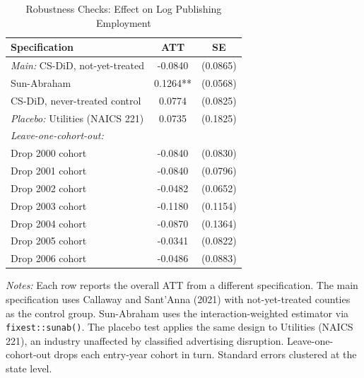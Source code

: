 \begin{table}[htbp]
\centering
\caption{Robustness Checks: Effect on Log Publishing Employment}
\label{tab:robust}
\begin{threeparttable}
\begin{tabular}{lcc}
\toprule
Specification & ATT & SE \\
\midrule
\textit{Main:} CS-DiD, not-yet-treated & -0.0840 & (0.0865) \\
Sun-Abraham & 0.1264** & (0.0568) \\
CS-DiD, never-treated control & 0.0774 & (0.0825) \\
\textit{Placebo:} Utilities (NAICS 221) & 0.0735 & (0.1825) \\
\midrule
\multicolumn{3}{l}{\textit{Leave-one-cohort-out:}} \\
\quad Drop 2000 cohort & -0.0840 & (0.0830) \\
\quad Drop 2001 cohort & -0.0840 & (0.0796) \\
\quad Drop 2002 cohort & -0.0482 & (0.0652) \\
\quad Drop 2003 cohort & -0.1180 & (0.1154) \\
\quad Drop 2004 cohort & -0.0870 & (0.1364) \\
\quad Drop 2005 cohort & -0.0341 & (0.0822) \\
\quad Drop 2006 cohort & -0.0486 & (0.0883) \\
\bottomrule
\end{tabular}
\begin{tablenotes}[flushleft]
\small
\item \textit{Notes:} Each row reports the overall ATT from a different specification. The main specification uses Callaway and Sant'Anna (2021) with not-yet-treated counties as the control group. Sun-Abraham uses the interaction-weighted estimator via \texttt{fixest::sunab()}. The placebo test applies the same design to Utilities (NAICS 221), an industry unaffected by classified advertising disruption. Leave-one-cohort-out drops each entry-year cohort in turn. Standard errors clustered at the state level.
\end{tablenotes}
\end{threeparttable}
\end{table}

